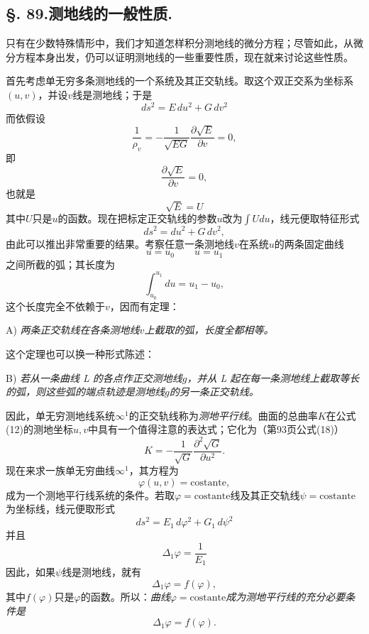 \subsection*{\S. 89.\quad 测地线的一般性质.}

只有在少数特殊情形中，我们才知道怎样积分测地线的微分方程；尽管如此，从微分方程本身出发，仍可以证明测地线的一些重要性质，现在就来讨论这些性质。

首先考虑单无穷多条测地线的一个系统及其正交轨线。取这个双正交系为坐标系\((u,v)\)，并设\(v\)线是测地线；于是
\[
 ds^2=E\,du^2+G\,dv^2
\]
而依假设
\[
 \frac1{\rho_v}=-\frac1{\sqrt{EG}}\frac{\partial\sqrt E}{\partial v}=0,
\]
即
\[
 \frac{\partial\sqrt E}{\partial v}=0,
\]
也就是
\[
 \sqrt E=U
\]
其中\(U\)只是\(u\)的函数。现在把标定正交轨线的参数\(u\)改为\(\int Udu\)，线元便取特征形式
\begin{equation}\tag{12}
 ds^2=du^2+G\,dv^2,
\end{equation}
由此可以推出非常重要的结果。考察任意一条测地线\(v\)在系统\(u\)的两条固定曲线
\[
 u=u_0\qquad u=u_1
\]
之间所截的弧；其长度为
\[
 \int_{u_0}^{u_1}du=u_1-u_0,
\]
这个长度完全不依赖于\(v\)，因而有定理：

A) \emph{两条正交轨线在各条测地线\(v\)上截取的弧，长度全都相等。}

这个定理也可以换一种形式陈述：

B) \emph{若从一条曲线 L 的各点作正交测地线\(g\)，并从 L 起在每一条测地线上截取等长的弧，则这些弧的端点轨迹是测地线\(g\)的另一条正交轨线。}

因此，单无穷测地线系统\(\infty^1\)的正交轨线称为\emph{测地平行线}。曲面的总曲率\(K\)在公式(12)的测地坐标\(u,v\)中具有一个值得注意的表达式；它化为（第93页公式(18)）
\begin{equation}\tag{13}
 K=-\frac1{\sqrt G}\frac{\partial^2\sqrt G}{\partial u^2}.
\end{equation}
现在来求一族单无穷曲线\(\infty^1\)，其方程为
\[
 \varphi(u,v)=\mathrm{costante},
\]
成为一个测地平行线系统的条件。若取\(\varphi=\mathrm{costante}\)线及其正交轨线\(\psi=\mathrm{costante}\)为坐标线，线元便取形式
\[
 ds^2=E_1\,d\varphi^2+G_1\,d\psi^2
\]
并且
\[
 \Delta_1\varphi=\frac1{E_1}
\]
因此，如果\(\psi\)线是测地线，就有
\[
 \Delta_1\varphi=f(\varphi),
\]
其中\(f(\varphi)\)只是\(\varphi\)的函数。所以：\emph{曲线\(\varphi=\mathrm{costante}\)成为测地平行线的充分必要条件是}
\[
 \Delta_1\varphi=f(\varphi).
\]

